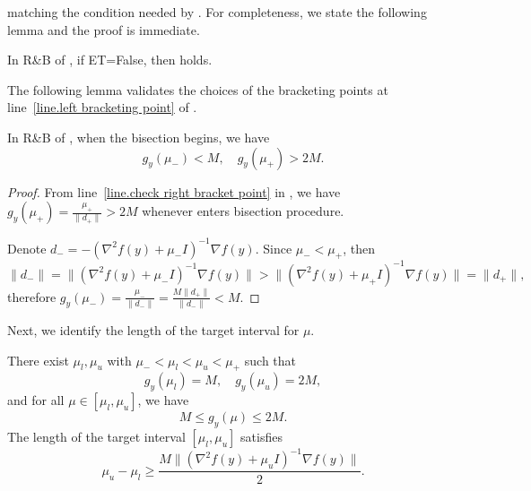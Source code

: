 \documentclass{article}
\begin{document}
matching the condition needed by . For completeness, we state the following lemma and the proof is immediate.
\begin{lemma}\label{lem.rboutput}
    In \textnormal{R\&B} of , if ET=False, then  holds.
\end{lemma}
The following lemma validates the choices of the bracketing points at line~\ref{line.left bracketing point} of .
\begin{lemma}
    \label{lem.valid bracketing}
    In \textnormal{R\&B} of , when the bisection begins, we have
    \begin{equation*}
        g_y(\mu_-) < M, \quad g_y(\mu_+) >2M.
    \end{equation*}
\end{lemma}
\begin{proof}
    From line~\ref{line.check right bracket point} in , we have $g_y(\mu_+)=\frac{\mu_+}{\|d_+\|} >2M$ whenever  enters bisection procedure.

    Denote $d_- = -\left(\nabla^2 f(y)+\mu_-I\right)^{-1}\nabla f(y)$. Since $\mu_- <\mu_+$, then
    \begin{equation*}
        \|d_-\|=\| (\nabla ^2 f(y)+\mu_- I )^{-1} \nabla f(y)\|>\| (\nabla ^2 f(y)+\mu_+ I )^{-1} \nabla f(y)\| = \|d_+\|,
    \end{equation*}
    therefore $g_y(\mu_-) = \frac{\mu_-}{\|d_-\|}=\frac{M\|d_+\|}{\|d_-\|}< M$.
\end{proof}
Next, we identify the length of the target interval for $\mu$.
\begin{lemma}
    \label{lem.bound target interval}
    There exist $\mu_l,\mu_u$ with $\mu_-<\mu_l<\mu_u<\mu_+$ such that
    \begin{equation}\label{eq.target interval bracketing points}
        g_{y}(\mu_l)=M, \quad g_{y}(\mu_u)=2M,
    \end{equation}
    and for all $\mu\in[\mu_l,\mu_u]$, we have
    \begin{equation*}
        M\leq g_y(\mu) \leq2M.
    \end{equation*}
    The length of the target interval $[\mu_l,\mu_u]$ satisfies
    \begin{equation}
        \label{eq.bound target interval}
        \mu_u-\mu_l \geq \frac{M\| (\nabla ^2 f(y)+\mu_u I  )^{-1}\nabla f(y)\|}{2}.
    \end{equation}
\end{lemma}
\end{document}
